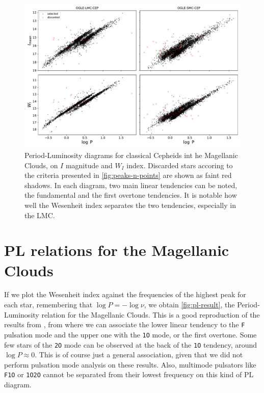 \begin{figure}
	\centering
	\includegraphics[width=\textwidth]{img/PL_realtion.pdf}
	\caption[Results: PL relation for the Magellanic Clouds]{
		Period-Luminosity diagrams for classical Cepheids int he Magellanic Clouds, on $I$ magnitude and $W_I$ index.
		Discarded stars accoring to the criteria presented in \autoref{fig:peaks-n-points} are shown as faint red shadows.
		In each diagram, two main linear tendencies can be noted, the fundamental and the first overtone tendencies.
		It is notable how well the Wesenheit index separates the two tendencies, especially in the LMC.
	}
	\label{fig:pl-result}
\end{figure}

\section{PL relations for the Magellanic Clouds}

If we plot the Wesenheit index against the frequencies of the highest peak for each star, remembering that $\log P=-\log \nu$, we obtain \autoref{fig:pl-result},
the Period-Luminosity relation for the Magellanic Clouds. This is a good reproduction of the results from \cite{OGLE2016}, 
from where we can associate the lower linear tendency to the \texttt{F} pulsation mode and the upper one with the \texttt{1O} mode, or the first overtone.
Some few stars of the \texttt{2O} mode can be observed at the back of the \texttt{1O} tendency, around $\log P\approx 0$.
This is of course just a general association, given that we did not perform pulsation mode analysis on these results.
Also, multimode pulsators like \texttt{F1O} or \texttt{1O2O} cannot be separated from their lowest frequency on this kind of PL diagram.




